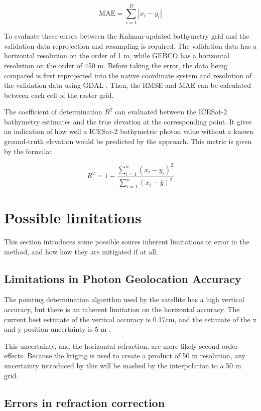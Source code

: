 $$ \text{MAE} = \sum_{i=1}^{D}|x_i-y_i| $$

To evaluate these errors between the Kalman-updated bathymetry grid and the validation data reprojection and resampling is required. The validation data has a horizontal resolution on the order of 1 m, while GEBCO has a horizontal resolution on the order of 450 m. Before taking the error, the data being compared is first reprojected into the native coordinate system and resolution of the validation data using GDAL \parencite{rouault_even_2022_6352176}. Then, the RMSE and MAE can be calculated between each cell of the raster grid.

The coefficient of determination $R^2$ can evaluated between the ICESat-2 bathymetry estimates and the true elevation at the corresponding point. It gives an indication of how well a ICESat-2 bathymetric photon value without a known ground-truth elevation would be predicted by the approach. This metric is given by the formula:

\begin{equation}
    R^2 = 1 - \frac{\sum_{i=1}^{n} (x_i - y_i)^2}{\sum_{i=1}^{n} (x_i - \bar{y})^2}
\end{equation}


\section{Possible limitations}

This section introduces some possible soures inherent limitations or error in the method, and how how they are mitigated if at all.

\subsection{Limitations in Photon Geolocation Accuracy}

The pointing determination algorithm used by the satellite has a high vertical accuracy, but there is an inherent limitation on the horizontal accuracy. The current best estimate of the vertical accuracy is 0.17cm, and the estimate of the x and y position uncertainty is 5 m \parencite{Neumann2019c}.

This uncertainty, and the horizontal refraction, are more likely second order effects. Because the kriging is used to create a product of 50 m resolution, any uncertainty introduced by this will be masked by the interpolation to a 50 m grid.

\subsection{Errors in refraction correction}


